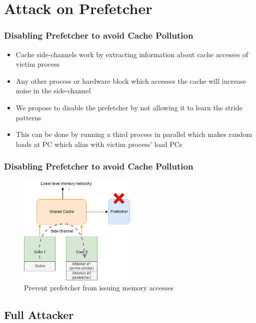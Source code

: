 \documentclass[10pt]{beamer}
\begin{document}
\section{Attack on Prefetcher}

\begin{frame}
\frametitle{Disabling Prefetcher to avoid Cache Pollution}
\begin{itemize}
    \item Cache side-channels work by extracting information about cache
        accesses of victim process
    \item Any other process or hardware block which accesses the cache will
        increase noise in the side-channel
    \item We propose to disable the prefetcher by not allowing it to learn the stride patterns
    \item This can be done by running a third process in parallel which makes
        random loads at PC which alias with victim process' load PCs
\end{itemize}
\end{frame}

\begin{frame}
\frametitle{Disabling Prefetcher to avoid Cache Pollution}
\begin{figure}[ht]
    \centering
    \includegraphics[width=0.5\textwidth]{figures/prefetch_attack}
    \caption{Prevent prefetcher from issuing memory accesses}
    \label{fig:prefetch_attack}
\end{figure}
\end{frame}

\subsection{Full Attacker}
\end{document}
